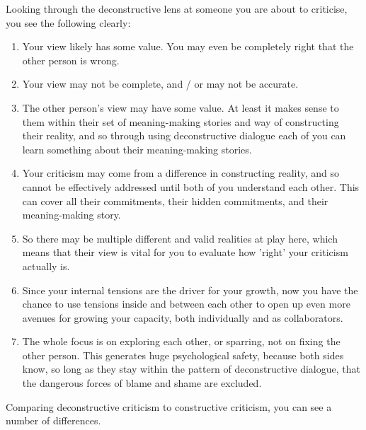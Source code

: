 Looking through the deconstructive lens at someone you are about to criticise, you see the following clearly:


\begin{enumerate}
\item Your view likely has some value. You may even be completely right that the other person is wrong. 
\item Your view may not be complete, and / or may not be accurate.
\item The other person's view may have some value. At least it makes sense to them within their set of meaning\hyp{}making stories and way of constructing their reality, and so through using deconstructive dialogue each of you can learn something about their meaning\hyp{}making stories.
\item Your criticism may come from a difference in constructing reality, and so cannot be effectively addressed until both of you understand each other. This can cover all their commitments, their hidden commitments, and their meaning\hyp{}making story.
\item So there may be multiple different and valid realities at play here, which means that their view is vital for you to evaluate how 'right' your criticism actually is.
\item Since your internal tensions are the driver for your growth, now you have the chance to use tensions inside and between each other to open up even more avenues for growing your capacity, both individually and as collaborators.
\item The whole focus is on exploring each other, or sparring, not on fixing the other person. This generates huge psychological safety, because both sides know, so long as they stay within the pattern of deconstructive dialogue, that the dangerous forces of blame and shame\cite{brown-rising} are excluded.
\end{enumerate}


Comparing deconstructive criticism to constructive criticism, you can see a number of differences. 


